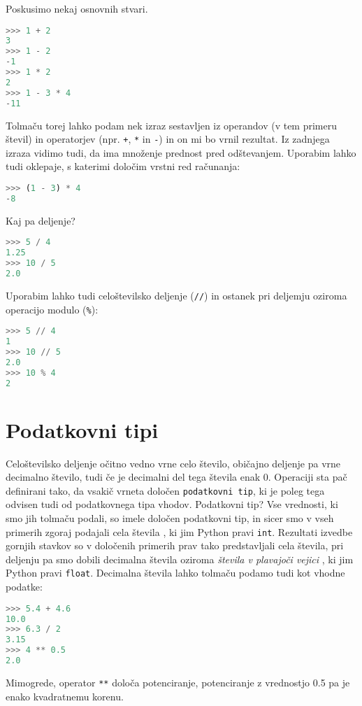 Poskusimo nekaj osnovnih stvari.
\begin{lstlisting}[language=Python]
>>> 1 + 2
3
>>> 1 - 2
-1
>>> 1 * 2
2
>>> 1 - 3 * 4
-11
\end{lstlisting}
Tolmaču torej lahko podam nek izraz sestavljen iz operandov (v tem primeru števil) in operatorjev (npr. \texttt{+}, \texttt{*} in \texttt{-}) in on mi bo vrnil rezultat. Iz zadnjega izraza vidimo tudi, da ima množenje prednost pred odštevanjem. Uporabim lahko tudi oklepaje, s katerimi določim vrstni red računanja:
\begin{lstlisting}[language=Python]
>>> (1 - 3) * 4
-8
\end{lstlisting}
Kaj pa deljenje? 
\begin{lstlisting}[language=Python]
>>> 5 / 4
1.25
>>> 10 / 5
2.0
\end{lstlisting}
Uporabim lahko tudi celoštevilsko deljenje (\texttt{//}) in ostanek pri deljemju oziroma operacijo modulo (\texttt{\%}): 
\begin{lstlisting}[language=Python]
>>> 5 // 4
1
>>> 10 // 5
2.0
>>> 10 % 4
2
\end{lstlisting}

\section{Podatkovni tipi}

Celoštevilsko deljenje očitno vedno vrne celo število, običajno deljenje pa vrne decimalno število, tudi če je decimalni del tega števila enak 0. Operaciji sta pač definirani tako, da vsakič vrneta določen \texttt{podatkovni tip}, ki je poleg tega odvisen tudi od podatkovnega tipa vhodov. Podatkovni tip? Vse vrednosti, ki smo jih tolmaču podali, so imele določen podatkovni tip, in sicer smo v vseh primerih zgoraj podajali cela števila , ki jim Python pravi \texttt{int}. Rezultati izvedbe gornjih stavkov so v določenih primerih prav tako predstavljali cela števila, pri deljenju pa smo dobili decimalna števila oziroma \emph{števila v plavajoči vejici} , ki jim Python pravi \texttt{float}. Decimalna števila lahko tolmaču podamo tudi kot vhodne podatke:
\begin{lstlisting}[language=Python]
>>> 5.4 + 4.6
10.0
>>> 6.3 / 2
3.15
>>> 4 ** 0.5
2.0
\end{lstlisting}
Mimogrede, operator \texttt{**} določa potenciranje, potenciranje z vrednostjo 0.5 pa je enako kvadratnemu korenu. 

